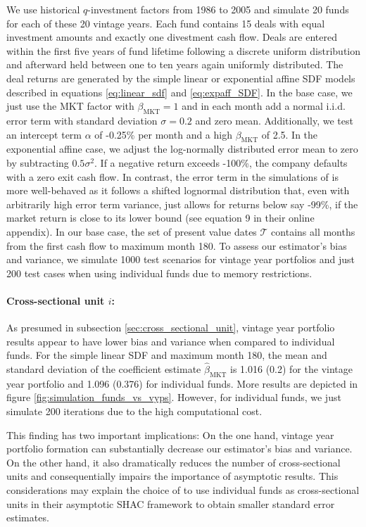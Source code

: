 \documentclass[12pt]{article}
\begin{document}
We use historical $q$-investment factors from 1986 to 2005 and simulate 20 funds for each of these 20 vintage years.
Each fund contains 15 deals with equal investment amounts and exactly one divestment cash flow.
Deals are entered within the first five years of fund lifetime following a discrete uniform distribution and afterward held between one to ten years again uniformly distributed.
The deal returns are generated by the simple linear or exponential affine SDF models described in equations \ref{eq:linear_sdf} and \ref{eq:expaff_SDF}.
In the base case, we just use the MKT factor with $\beta_{\mathrm{MKT}}=1$ and in each month add a normal i.i.d. error term with standard deviation $\sigma=0.2$ and zero mean.
Additionally, we test an intercept term $\alpha$ of -0.25\% per month and a high $\beta_{\mathrm{MKT}}$ of 2.5.
In the exponential affine case, we adjust the log-normally distributed error mean to zero by subtracting $0.5 \sigma^2$.
If a negative return exceeds -100\%, the company defaults with a zero exit cash flow.
In contrast, the error term in the simulations of \cite{DLP12} is more well-behaved as it follows a shifted lognormal distribution that, even with arbitrarily high error term variance, just allows for returns below say -99\%, if the market return is close to its lower bound (see equation 9 in their online appendix).
In our base case, the set of present value dates $\mathcal{T}$ contains all months from the first cash flow to maximum month 180.
To assess our estimator's bias and variance, we simulate 1000 test scenarios for vintage year portfolios and just 200 test cases when using individual funds due to memory restrictions.


\paragraph{Cross-sectional unit $i$:}
As presumed in subsection \ref{sec:cross_sectional_unit}, vintage year portfolio results appear to have lower bias and variance when compared to individual funds.
For the simple linear SDF and maximum month 180, the mean and standard deviation of the coefficient estimate $\hat{\beta}_{\mathrm{MKT}}$ is 1.016 (0.2) for the vintage year portfolio and 1.096 (0.376) for individual funds. 
More results are depicted in figure \ref{fig:simulation_funds_vs_vyps}.
However, for individual funds, we just simulate 200 iterations due to the high computational cost.

This finding has two important implications:
On the one hand, vintage year portfolio formation can substantially decrease our estimator's bias and variance.
On the other hand, it also dramatically reduces the number of cross-sectional units and consequentially impairs the importance of asymptotic results.
This considerations may explain the choice of \cite{KN16} to use individual funds as cross-sectional units in their asymptotic SHAC framework to obtain smaller standard error estimates.
\end{document}
